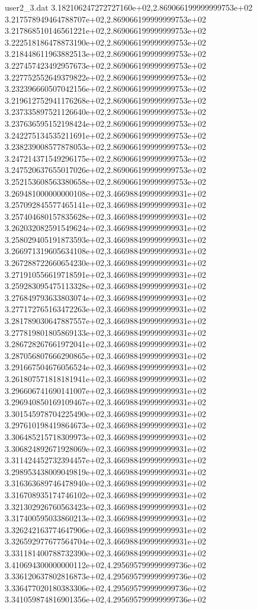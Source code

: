 \begin{filecontents}{user2_3.dat}
3.182106247272727160e+02,2.869066199999999753e+02
3.217578949464788707e+02,2.869066199999999753e+02
3.217868510146561221e+02,2.869066199999999753e+02
3.222518186478873190e+02,2.869066199999999753e+02
3.218448611963882513e+02,2.869066199999999753e+02
3.227457423492957673e+02,2.869066199999999753e+02
3.227752552649379822e+02,2.869066199999999753e+02
3.232396660507042156e+02,2.869066199999999753e+02
3.219612752941176268e+02,2.869066199999999753e+02
3.237335897521126640e+02,2.869066199999999753e+02
3.237636595152198424e+02,2.869066199999999753e+02
3.242275134535211691e+02,2.869066199999999753e+02
3.238239008577878053e+02,2.869066199999999753e+02
3.247214371549296175e+02,2.869066199999999753e+02
3.247520637655017026e+02,2.869066199999999753e+02
3.252153608563380658e+02,2.869066199999999753e+02
3.269481000000000108e+02,3.466988499999999931e+02
3.257092845577465141e+02,3.466988499999999931e+02
3.257404680157835628e+02,3.466988499999999931e+02
3.262032082591549624e+02,3.466988499999999931e+02
3.258029405191873593e+02,3.466988499999999931e+02
3.266971319605634108e+02,3.466988499999999931e+02
3.267288722660654230e+02,3.466988499999999931e+02
3.271910556619718591e+02,3.466988499999999931e+02
3.259283095475113328e+02,3.466988499999999931e+02
3.276849793633803074e+02,3.466988499999999931e+02
3.277172765163472263e+02,3.466988499999999931e+02
3.281789030647887557e+02,3.466988499999999931e+02
3.277819801805869133e+02,3.466988499999999931e+02
3.286728267661972041e+02,3.466988499999999931e+02
3.287056807666290865e+02,3.466988499999999931e+02
3.291667504676056524e+02,3.466988499999999931e+02
3.261807571818181941e+02,3.466988499999999931e+02
3.296606741690141007e+02,3.466988499999999931e+02
3.296940850169109467e+02,3.466988499999999931e+02
3.301545978704225490e+02,3.466988499999999931e+02
3.297610198419864673e+02,3.466988499999999931e+02
3.306485215718309973e+02,3.466988499999999931e+02
3.306824892671928069e+02,3.466988499999999931e+02
3.311424452732394457e+02,3.466988499999999931e+02
3.298953438009049819e+02,3.466988499999999931e+02
3.316363689746478940e+02,3.466988499999999931e+02
3.316708935174746102e+02,3.466988499999999931e+02
3.321302926760563423e+02,3.466988499999999931e+02
3.317400595033860213e+02,3.466988499999999931e+02
3.326242163774647906e+02,3.466988499999999931e+02
3.326592977677564704e+02,3.466988499999999931e+02
3.331181400788732390e+02,3.466988499999999931e+02
3.410694300000000112e+02,4.295695799999999736e+02
3.336120637802816873e+02,4.295695799999999736e+02
3.336477020180383306e+02,4.295695799999999736e+02
3.341059874816901356e+02,4.295695799999999736e+02

\end{filecontents}
